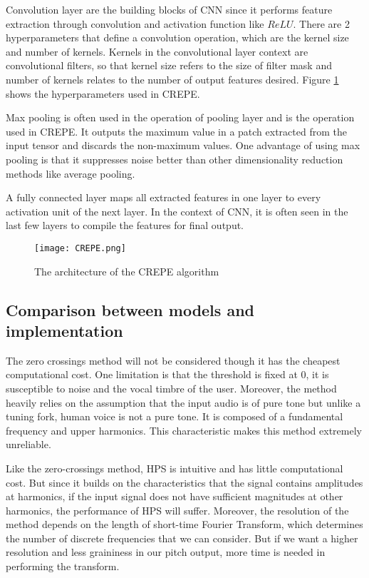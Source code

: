 \begin{enumerate}
	Convolution layer are the building blocks of CNN since it performs feature extraction through convolution and activation function like $ReLU$.
	There are 2 hyperparameters that define a convolution operation, which are the kernel size and number of kernels. Kernels in the convolutional layer context are convolutional
	filters, so that kernel size refers to the size of filter mask and number of kernels relates to the number of output features desired. Figure \ref{CREPE} shows the hyperparameters
	used in CREPE.

	Max pooling is often used in the operation of pooling layer and is the operation used in CREPE. It outputs the maximum value in a patch extracted from the
	input tensor and discards the non-maximum values. 
	One advantage of using max pooling is that it suppresses noise better than other dimensionality reduction methods like average pooling.

	A fully connected layer maps all extracted features in one layer to every activation unit of the next layer. In the context of CNN, it is often seen in the
	last few layers to compile the features for final output.

	\begin{figure}
		\texttt{[image: CREPE.png]}
		\caption{The architecture of the CREPE algorithm \cite{CREPE}}
		\label{CREPE}
	\end{figure}

\end{enumerate}

\subsection{Comparison between models and implementation}
The zero crossings method will not be considered though it has the cheapest computational cost. One limitation is that
the threshold is fixed at 0, it is susceptible to noise and the vocal timbre of the user. Moreover, the method heavily relies on
the assumption that the input audio is of pure tone but unlike a tuning fork, human voice is not a pure tone. It is 
composed of a fundamental frequency and upper harmonics. \cite{humanmono} This characteristic makes this method extremely
unreliable.

Like the zero-crossings method, HPS is intuitive and has little computational cost. But since it builds on the characteristics 
that the signal contains amplitudes at harmonics, if the input signal does not have sufficient magnitudes at other harmonics, the 
performance of HPS will suffer. Moreover, the resolution of the method depends on the length of short-time Fourier Transform, which
determines the number of discrete frequencies that we can consider. But if we want a higher resolution and less graininess in our 
pitch output, more time is needed in performing the transform.

